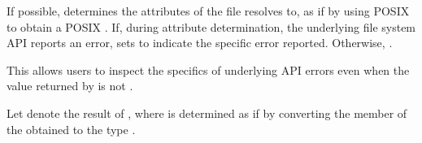 \begin{itemdescr}
\pnum
\effects
If possible, determines the attributes
    of the file  resolves to, as if by using POSIX 
    to obtain a POSIX .
      If, during attribute determination, the underlying file system API reports
    an error, sets  to indicate the specific error reported.
    Otherwise, .
\begin{note} This allows users to inspect the specifics of underlying
      API errors even when the value returned by  is not
      . \end{note}

\pnum
Let  denote the result of ,
where  is determined as if by converting the  member
of the obtained  to the type .


\end{itemdescr}
